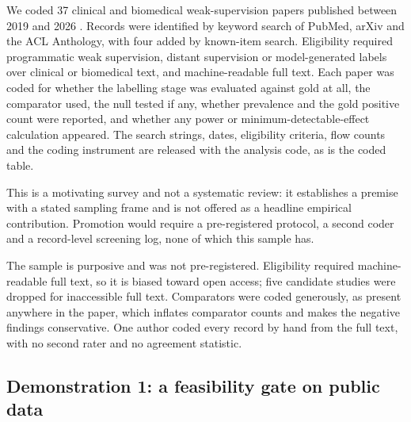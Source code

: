 \documentclass[review]{elsarticle}
\begin{document}
We coded 37 clinical and biomedical weak-supervision papers published between
2019 and 2026 \cite{fries2021trove,das2025criticalfindings,hsu2025knowledgefree,datta2023spatial,wang2019weaksupervisionparadigm,banerjee2019weaklysupervised,vidmar2025probabilistic,jeffery2024noisylabels,azzouzi2024deidentification,dong2023raredisease,wang2022ophthalmologyexam,bejan2022suicidality,shen2022lifestyle,zhang2021chestxray,danniballe2022multilabel,nogues2022weaklysemisupervised,gan2025arch,zhu2021distantlysupervised,vashishth2021medtype,eyuboglu2021multitask,cusick2021suicidalideation,kshatriya2020inhaler,gori2019patientcentered,hsieh2024genegene,agnikula2021asthmacontrol,sanyal2021recurrence,godoy2026mammography,sandlin2026decisional,algaradi2026copd,greco2026west,gao2022keyclass,irvin2019chexpert,smit2020chexbert,agrawal2022fewshot,guevara2024sdoh,yoon2023kbrefined,huemann2023nuclearmedicine}. Records were identified by keyword search of PubMed, arXiv and the ACL Anthology, with four added by known-item search. Eligibility required
programmatic weak supervision, distant supervision or model-generated labels over clinical or
biomedical text, and machine-readable full text. Each paper was coded for whether
the labelling stage was evaluated against gold at all, the comparator used, the
null tested if any, whether prevalence and the gold positive count were reported,
and whether any power or minimum-detectable-effect calculation appeared. The
search strings, dates, eligibility criteria, flow counts and the coding
instrument are released with the analysis code, as is the coded table.

This is a motivating survey and not a systematic review: it establishes a premise
with a stated sampling frame and is not offered as a headline empirical
contribution. Promotion would require a pre-registered protocol, a second coder
and a record-level screening log, none of which this sample has.

The sample is purposive and was not pre-registered. Eligibility
required machine-readable full text, so it is biased toward open access; five
candidate studies were dropped for inaccessible full text. Comparators were coded
generously, as present anywhere in the paper, which inflates comparator counts
and makes the negative findings conservative. One author coded every record by hand from the full
text, with no second rater and no agreement statistic.

\subsection{Demonstration 1: a feasibility gate on public data}
\label{sec:mat-d1}
\end{document}
